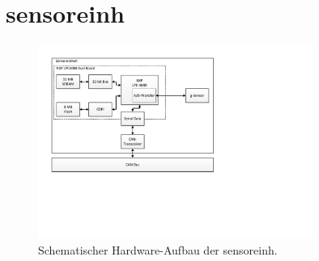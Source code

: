 \section{\gls{sensoreinh}}

\begin{figure}[H]
	\centering
		\includegraphics[width=0.8\textwidth]{images/visio/hardware_sensor.pdf}
	\caption{Schematischer Hardware-Aufbau der \gls{sensoreinh}.}
	\label{fig.hw_sensor}
\end{figure}


